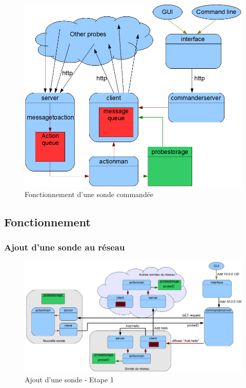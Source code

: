 \documentclass[a4paper,11pt]{article}
\begin{document}
\begin{figure}
\centering\includegraphics[width=\linewidth]{img/graphCommander.png}
\caption{Fonctionnement d'une sonde commandée}
\end{figure}


\newpage
\subsection{Fonctionnement}

\subsubsection{Ajout d'une sonde au réseau}

\begin{figure}
\centering\includegraphics[width=\linewidth]{img/graphAdd1.png}
\caption{Ajout d'une sonde - Etape 1}
\end{figure}
\end{document}
